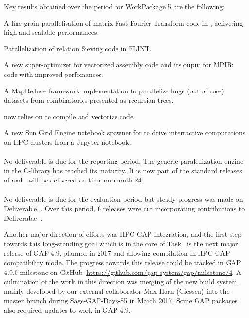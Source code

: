 \documentclass{deliverablereport}
\begin{document}
  Key results obtained over the period for WorkPackage 5 are the following:
  \begin{compactitem}
  \item A fine grain parallelisation of matrix Fast Fourier Transform code in
    \FLINT, delivering high and scalable performances.
  \item Parallelization of relation  Sieving code in FLINT.
  \item A new super-optimizer for vectorized assembly code and its ouput for
    MPIR: code with improved perfomances.
  \item A MapReduce framework implementation to parallelize huge (out of core) datasets from
    combinatorics presented as recursion trees.
  \item \Cython now relies on \Pythran to compile and vectorize \Numpy code.
  \item A new Sun Grid Engine notebook spawner for \Jupyter to drive
    interractive computations on HPC clusters from a Jupyter notebook.
  \end{compactitem}

\paragraph{}

No deliverable is due for the reporting period.
The generic paralellization engine in the \Pari C-library
has reached its maturity. It is now part of the standard releases of \Pari
and~
will be delivered on time on month 24.

\paragraph{}

No deliverable is due for the evaluation period but steady progress was made on
Deliverable~. Over this period, 6 releases were cut
incorporating contributions to Deliverable~.

Another major direction of efforts was HPC-GAP integration, and the first step
towards this long-standing goal which is in the core of
Task~ is the next
major release of GAP 4.9, planned in 2017 and allowing compilation in HPC-GAP
compatibility mode. The progress towards this release could be tracked in GAP
4.9.0 milestone on GitHub: \url{https://github.com/gap-system/gap/milestone/4}. 
A culmination of the work in this direction was merging of the new build system, 
mainly developed by our external collaborator Max Horn (Giessen) into the master 
branch during Sage-GAP-Days-85 in March 2017. Some GAP packages also required
updates to work in GAP 4.9.
\end{document}
